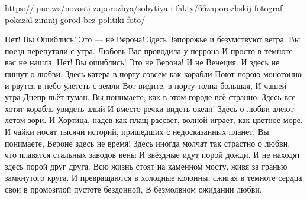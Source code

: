 
 
 
 
 

\url{https://ipne.ws/novosti-zaporozhya/sobytiya-i-fakty/66zaporozhskij-fotograf-pokazal-zimnij-gorod-bez-politiki-foto/}

Нет! Вы Ошиблись! Это — не Верона!
Здесь Запорожье и безумствуют ветра.
Вы поезд перепутали с утра.
Любовь Вас проводила у перрона
И просто в темноте вас не нашла.
Нет! Вы ошиблись! Это не Верона! И не Венеция.
И здесь не пишут о любви.
Здесь катера в порту совсем как корабли
Поют порою монотонно и рвутся в небо улететь с земли
Вот видите, в порту толпа большая,
И чашей утра Днепр пьёт туман.
Вы понимаете, как в этом городе всё странно.
Здесь все хотят корабль увидеть алый
И вместо речки видеть океан!
Здесь о любви алеют летом зори.
И Хортица, надев как плащ рассвет,
волной играет, как цветное море.
И чайки носят тысячи историй,
пришедших с недосказанных планет.
Вы понимаете, Вероне здесь не время!
Здесь иногда молчат так страстно о любви,
что плавятся стальных заводов вены
И звёздные идут порой дожди.
И не находят здесь порой друг друга.
Всю жизнь стоят на каменном мосту,
живя за гранью замкнутого круга.
И превращаются в холодные колонны,
сжигая в темноте сердца свои
в промозглой пустоте бездонной,
В безмолвном ожидании любви.
